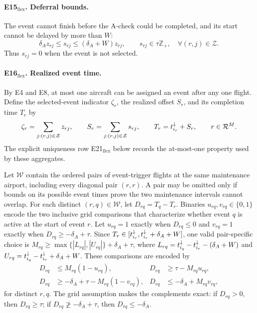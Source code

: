 \paragraph{E15$_{\mathrm{flex}}$. Deferral bounds.}
The event cannot finish before the A-check could be completed, and its start
cannot be delayed by more than $W$:
\begin{equation}\label{eq:E15_flex}
\delta_A z_{rj}\leq s_{rj}\leq(\delta_A+W)z_{rj},
\qquad s_{rj}\in\tau\mathbb{Z}_{+},\quad \forall (r,j)\in\mathcal{Z}.
\end{equation}
Thus $s_{rj}=0$ when the event is not selected.

\paragraph{E16$_{\mathrm{flex}}$. Realized event time.}
By E4 and E8, at most one aircraft can be assigned an event after any one
flight. Define the selected-event indicator $\zeta_r$, the realized offset
$S_r$, and its completion time $T_r$ by
\begin{equation}\label{eq:E16_flex}
\zeta_r=\sum_{j:(r,j)\in\mathcal{Z}}z_{rj},\qquad
S_r=\sum_{j:(r,j)\in\mathcal{Z}}s_{rj},\qquad
T_r=t^{\downarrow}_{i_r}+S_r,
\qquad r\in\mathcal{R}^{M}.
\end{equation}
The explicit uniqueness row E21$_{\mathrm{flex}}$ below records the at-most-one
property used by these aggregates.

Let $\mathcal{W}$ contain the ordered pairs of event-trigger flights at the
same maintenance airport, including every diagonal pair $(r,r)$. A pair may
be omitted only if bounds on its possible event times prove the two maintenance
intervals cannot overlap. For each distinct $(r,q)\in\mathcal{W}$, let
$D_{rq}=T_q-T_r$. Binaries $u_{rq},v_{rq}\in\{0,1\}$ encode the two
inclusive grid comparisons that characterize whether event $q$ is active at
the start of event $r$. Let $u_{rq}=1$ exactly when $D_{rq}\leq0$ and
$v_{rq}=1$ exactly when $D_{rq}\geq-\delta_A+\tau$. Since
$T_r\in[t^{\downarrow}_{i_r},t^{\downarrow}_{i_r}+\delta_A+W]$, one valid pair-specific choice is
$M_{rq}\geq\max\{|L_{rq}|,|U_{rq}|\}+\delta_A+\tau$, where
$L_{rq}=t^{\downarrow}_{i_q}-t^{\downarrow}_{i_r}-(\delta_A+W)$ and
$U_{rq}=t^{\downarrow}_{i_q}-t^{\downarrow}_{i_r}+\delta_A+W$. These comparisons are encoded by
\begin{align}
D_{rq}&\leq M_{rq}(1-u_{rq}), &
D_{rq}&\geq \tau-M_{rq}u_{rq},
\label{eq:E17_flex}\\
D_{rq}&\geq-\delta_A+\tau-M_{rq}(1-v_{rq}), &
D_{rq}&\leq-\delta_A+M_{rq}v_{rq},
\label{eq:E18_flex}
\end{align}
for distinct $r,q$. The grid assumption makes the complements exact: if
$D_{rq}>0$, then $D_{rq}\geq\tau$; if $D_{rq}\not\geq-\delta_A+\tau$,
then $D_{rq}\leq-\delta_A$.

